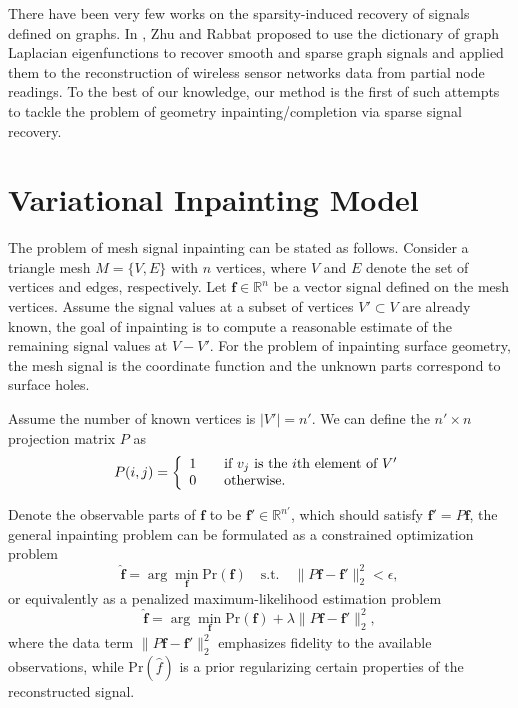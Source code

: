 There have been very few works on the sparsity-induced recovery of
signals defined on graphs. In \cite{Zhu2012}, Zhu
and Rabbat proposed to use the dictionary of graph Laplacian
eigenfunctions to recover smooth and sparse graph signals and applied them
to the reconstruction of wireless sensor networks data from partial
node readings. To the best of our knowledge, our method is the first
of such attempts to tackle the problem of geometry
inpainting/completion via sparse signal recovery.

\section{Variational Inpainting Model}
\label{sec:inpaint:model}

The problem of mesh signal inpainting can be stated as follows.
Consider a triangle mesh $M=\{V,E\}$ with $n$ vertices, where $V$ and
$E$ denote the set of vertices and edges, respectively. Let
$\mathbf{f}\in\mathbb{R}^n$ be a vector signal defined on the mesh
vertices. Assume the signal values at a subset of vertices $V'\subset
V$ are already known, the goal of inpainting is to compute a
reasonable estimate of the remaining signal values at $V - V'$. For
the problem of inpainting surface geometry, the mesh signal is the
coordinate function and the unknown parts correspond to surface holes.

Assume the number of known vertices is $|V'|=n'$. We can define the
$n' \times n$ projection matrix $P$ as
\begin{equation}
P(i,j) = \left\{
    \begin{array}{l l}
    1 & \quad \text{if $v_j$ is the $i$th element of $V'$}\\
    0 & \quad \text{otherwise.}
    \end{array}\right.
\end{equation}

Denote the observable parts of $\mathbf{f}$ to be $\mathbf{f'} \in
\mathbb{R}^{n'}$, which should satisfy $\mathbf{f}' = P\mathbf{f}$,
the general inpainting problem can be formulated as a constrained
optimization problem
\begin{equation}
\label{eq:inpainting}
\hat{\mathbf{f}} = \arg\min_{\mathbf{f}} \text{Pr}(\mathbf{f}) \quad \text{s.t.} \quad \|P\mathbf{f} - \mathbf{f'}\|_2^2 < \epsilon,
\end{equation}
or equivalently as a penalized maximum-likelihood estimation problem
\begin{equation}
\label{eq:inpainting2}
\hat{\mathbf{f}} = \arg\min_{\mathbf{f}} \text{Pr}(\mathbf{f}) + \lambda \|P\mathbf{f} - \mathbf{f}'\|_2^2,
\end{equation}
where the data term $\|P\mathbf{f} - \mathbf{f}'\|_2^2$ emphasizes
fidelity to the available observations, while $\text{Pr}(\hat{f})$ is
a prior regularizing certain properties of the reconstructed signal.

